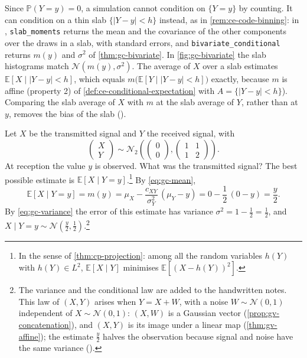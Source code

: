 \begin{remark}[computational]\label{rem:gc-code-bivariate}
Since $\mathbb P(Y=y)=0$, a simulation cannot condition on $\{Y=y\}$ by counting. It can condition
on a thin slab $\{|Y-y|<h\}$ instead, as in \cref{rem:ce-code-binning}: in
, \texttt{slab\_moments} returns the mean and
the covariance of the other components over the draws in a slab, with standard errors, and
\texttt{bivariate\_conditional} returns $m(y)$ and $\sigma^2$ of \cref{thm:gc-bivariate}. In
\cref{fig:gc-bivariate} the slab histograms match $\mathcal N(m(y),\sigma^2)$. The average of $X$
over a slab estimates $\mathbb E[X\mid|Y-y|<h]$, which equals $m\big(\mathbb E[Y\mid|Y-y|<h]\big)$
exactly, because $m$ is affine (property 2) of \cref{def:ce-conditional-expectation} with
$A=\{|Y-y|<h\}$). Comparing the slab average of $X$ with $m$ at the slab average of $Y$, rather than
at $y$, removes the bias of the slab ().
\end{remark}


\begin{example}\label{exa:gc-signal}
Let $X$ be the transmitted signal and $Y$ the received signal, with
\[
  \begin{pmatrix}X\\Y\end{pmatrix}\sim\mathcal N_2\left(\begin{pmatrix}0\\0\end{pmatrix},
  \begin{pmatrix}1&1\\1&2\end{pmatrix}\right).
\]
At reception the value $y$ is observed. What was the transmitted signal? The best possible estimate
is $\mathbb E[X\mid Y=y]$.\footnote{In the sense of \cref{thm:cp-projection}: among all the random
variables $h(Y)$ with $h(Y)\in L^2$, $\mathbb E[X\mid Y]$ minimises $\mathbb E[(X-h(Y))^2]$.} By
\eqref{eq:gc-mean},
\[
  \mathbb E[X\mid Y=y]=m(y)=\mu_X-\frac{c_{XY}}{\sigma_Y^2}\,(\mu_Y-y)=0-\frac12\,(0-y)=\frac y2 .
\]
By \eqref{eq:gc-variance} the error of this estimate has variance $\sigma^2=1-\frac12=\frac12$, and
$X\mid Y=y\sim\mathcal N(\frac y2,\frac12)$.\footnote{The variance and the conditional law are added
to the handwritten notes. This law of $(X,Y)$ arises when $Y=X+W$, with a noise $W\sim\mathcal N(0,1)$
independent of $X\sim\mathcal N(0,1)$: $(X,W)$ is a Gaussian vector (\cref{prop:gv-concatenation}),
and $(X,Y)$ is its image under a linear map (\cref{thm:gv-affine}); the estimate
$\frac y2$ halves the observation because signal and noise have the same variance
().}
\end{example}

